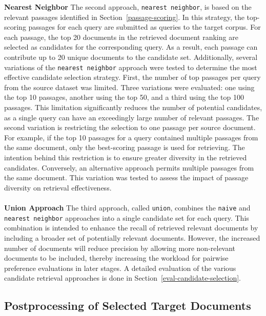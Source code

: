 \textbf{Nearest Neighbor} The second approach, \texttt{nearest neighbor}, is based on the relevant passages identified in Section~\ref{passage-scoring}. In this strategy, the top-scoring passages for each query are submitted as queries to the target corpus. For each passage, the top 20 documents in the retrieved document ranking are selected as candidates for the corresponding query. As a result, each passage can contribute up to 20 unique documents to the candidate set. Additionally, several variations of the \texttt{nearest neighbor} approach were tested to determine the most effective candidate selection strategy. First, the number of top passages per query from the source dataset was limited. Three variations were evaluated: one using the top 10 passages, another using the top 50, and a third using the top 100 passages. This limitation significantly reduces the number of potential candidates, as a single query can have an exceedingly large number of relevant passages. The second variation is restricting the selection to one passage per source document. For example, if the top 10 passages for a query contained multiple passages from the same document, only the best-scoring passage is used for retrieving. The intention behind this restriction is to ensure greater diversity in the retrieved candidates. Conversely, an alternative approach permits multiple passages from the same document. This variation was tested to assess the impact of passage diversity on retrieval effectiveness.
\\\\
\textbf{Union Approach} The third approach, called \texttt{union}, combines the \texttt{naive} and \texttt{nearest neighbor} approaches into a single candidate set for each query. This combination is intended to enhance the recall of retrieved relevant documents by including a broader set of potentially relevant documents. However, the increased number of documents will reduce precision by allowing more non-relevant documents to be included, thereby increasing the workload for pairwise preference evaluations in later stages. A detailed evaluation of the various candidate retrieval approaches is done in Section~\ref{eval-candidate-selection}.

\subsection{Postprocessing of Selected Target Documents}\label{postprocessing-of-selected-target-documents}

